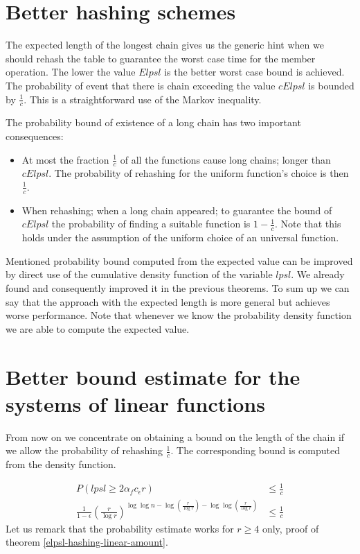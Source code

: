 \section{Better hashing schemes}
The expected length of the longest chain gives us the generic hint when we should rehash the table to guarantee the worst case time for the member operation. The lower the value $E lpsl$ is the better worst case bound is achieved. The probability of event that there is chain exceeding the value $c E lpsl$ is bounded by $\frac{1}{c}$. This is a straightforward use of the Markov inequality. 

The probability bound of existence of a long chain has two important consequences:
\begin{itemize}
\item At most the fraction $\frac{1}{c}$ of all the functions cause long chains; longer than $c E lpsl$. The probability of rehashing for the uniform function's choice is then $\frac{1}{c}$.
\item When rehashing; when a long chain appeared; to guarantee the bound of $c E lpsl$ the probability of finding a suitable function is $1 - \frac{1}{c}$. Note that this holds under the assumption of the uniform choice of an universal function.
\end{itemize}

Mentioned probability bound computed from the expected value can be improved by direct use of the cumulative density function of the variable $lpsl$. We already found and consequently improved it in the previous theorems. To sum up we can say that the approach with the expected length is more general but achieves worse performance. Note that whenever we know the probability density function we are able to compute the expected value.

\section{Better bound estimate for the systems of linear functions}
\label{section-linear-systems-linear-amount-constant-estimate}
From now on we concentrate on obtaining a bound on the length of the chain if we allow the probability of rehashing $\frac{1}{c}$. The corresponding bound is computed from the density function.

\begin{displaymath}
\begin{split}
P(lpsl \geq 2\alpha_f c_\epsilon r) & \leq \frac{1}{c} \\ 
\frac{1}{1 - \epsilon}\left(\frac{r}{\log r}\right)^{\log \log n - \log \left(\frac{r}{\log r}\right) - \log \log \left(\frac{r}{\log r}\right)} & \leq \frac{1}{c}
\end{split}
\end{displaymath}
Let us remark that the probability estimate works for $r \geq 4$ only, proof of theorem \ref{elpsl-hashing-linear-amount}.

